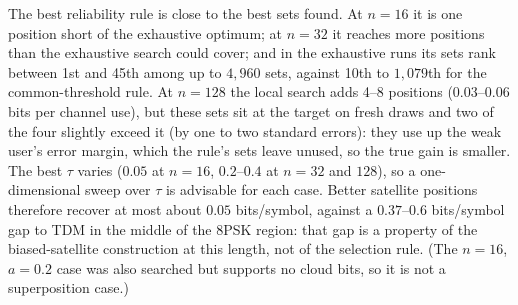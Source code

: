 \documentclass[11pt]{article}
\begin{document}
The best reliability rule is close to the best sets found. At $n=16$ it is one position short of the exhaustive optimum; at $n=32$ it reaches more positions than the exhaustive search could cover; and in the exhaustive runs its sets rank between 1st and 45th among up to $4{,}960$ sets, against 10th to $1{,}079$th for the common-threshold rule. At $n=128$ the local search adds 4--8 positions ($0.03$--$0.06$ bits per channel use), but these sets sit at the target on fresh draws and two of the four slightly exceed it (by one to two standard errors): they use up the weak user's error margin, which the rule's sets leave unused, so the true gain is smaller. The best $\tau$ varies ($0.05$ at $n=16$, $0.2$--$0.4$ at $n=32$ and $128$), so a one-dimensional sweep over $\tau$ is advisable for each case. Better satellite positions therefore recover at most about $0.05$ bits/symbol, against a $0.37$--$0.6$ bits/symbol gap to TDM in the middle of the 8PSK region: that gap is a property of the biased-satellite construction at this length, not of the selection rule. (The $n=16$, $a=0.2$ case was also searched but supports no cloud bits, so it is not a superposition case.)

\FloatBarrier
\end{document}
